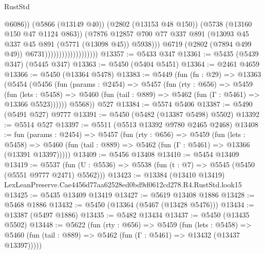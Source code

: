 \begin{lexlean}{RustStd}
\begin{coremodule}
                                                @6086))
                                            (@5866 (@13149 @40))
                                            (@2802 (@13153 @48 @150))
                                            (@5738 (@13160 @150 @47 @1124 @863))
                                            (@7876
                                              @12857
                                              @700
                                              @77
                                              @337
                                              @891
                                              (@13093
                                                @45
                                                @337
                                                @45
                                                @891
                                                (@5771 (@13098 @45))
                                                @5938)))
                                          @6719
                                          (@2802 (@7894 @499 @49))
                                          @6731)))))))))))))))))))
@13357 := @5433 @347
@13361 := @5435 (@5439 @347) (@5445 @347)
@13363 := @5450 (@5404 @5451)
@13364 := @2461 @4659
@13366 := @5450 (@13364 @5478)
@13383 := @5449
    (fun (fn : @29) =>
    @13363
      (@5454
        (@5456
          (fun (params : @2454) =>
          @5457
            (fun (rty : @656) =>
            @5459
              (fun (lets : @5458) =>
              @5460 (fun (tail : @889) => @5462 (fun (Γ : @5461) => @13366 @5523))))))
        @5568))
    @527
@13384 := @5574 @5406
@13387 := @5490 (@5491 @527) @9777
@13391 := @5450 (@5482 (@13387 @5498) @5502)
@13392 := @5514 @527
@13397 := @5511 (@5513 @13392 @9780 @2465 @2468)
@13408 := fun (params : @2454) =>
  @5457
    (fun (rty : @656) =>
    @5459
      (fun (lets : @5458) =>
      @5460 (fun (tail : @889) => @5462 (fun (Γ : @5461) => @13366 (@13391 @13397)))))
@13409 := @5456 @13408
@13410 := @5454 @13409
@13419 := @5537 (fun (U : @5536) => @5538 (fun (t : @7) => @5545 (@5450 (@5551 @9777 @2471) @5562)))
@13423 := @13384 (@13410 @13419) LexLeanPreserve.Cae4456d77aa62528ed0bd9d0612cd278.R4.RustStd.look15
@13425 := @5435 @13409 @13419
@13427 := @5619 @13408 @1886
@13428 := @5468 @1886
@13432 := @5450 (@13364 (@5467 (@13428 @5476)))
@13434 := @13387 (@5497 @1886)
@13435 := @5482 @13434
@13437 := @5450 (@13435 @5502)
@13448 := @5622
    (fun (rty : @656) =>
    @5459
      (fun (lets : @5458) =>
      @5460 (fun (tail : @889) => @5462 (fun (Γ : @5461) => @13432 (@13437 @13397)))))

\end{coremodule}
\end{lexlean}
